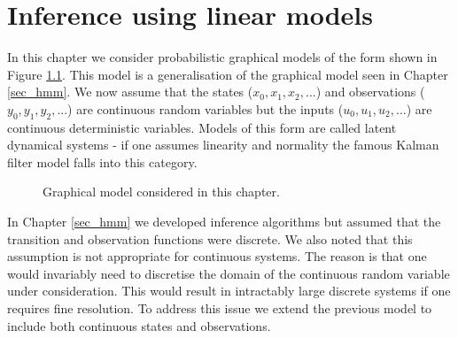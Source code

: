 \chapter{Inference using linear models}
\label{sec_inf_lin_mods}
In this chapter we consider probabilistic graphical models of the form shown in Figure \ref{fig_linmod2}. This model is a generalisation of the graphical model seen in Chapter \ref{sec_hmm}. We now assume that the states ($x_0,x_1,x_2,...$) and observations ($y_0,y_1,y_2,...$) are continuous random variables but the inputs ($u_0,u_1,u_2,...$) are continuous deterministic variables. Models of this form are called latent dynamical systems - if one assumes linearity and normality the famous Kalman filter model falls into this category.
\begin{figure}[H] 
\centering
{}
\caption{Graphical model considered in this chapter.}
\label{fig_linmod2}
\end{figure}
In Chapter \ref{sec_hmm} we developed inference algorithms but assumed that the transition and observation functions were discrete. We also noted that this assumption is not appropriate for continuous systems. The reason is that one would invariably need to discretise the domain of the continuous random variable under consideration. This would result in intractably large discrete systems if one requires fine resolution. To address this issue we extend the previous model to include both continuous states and observations. 

